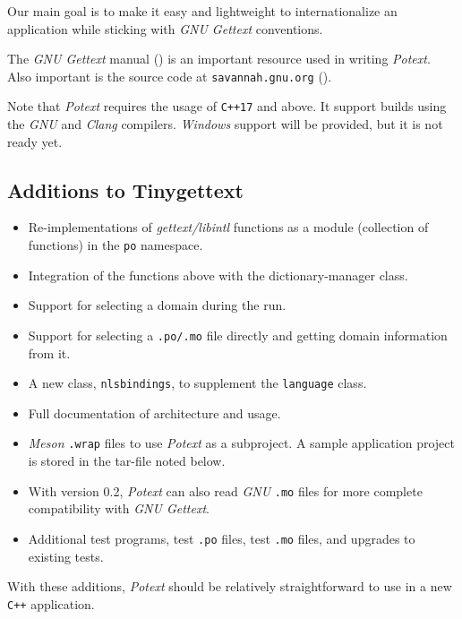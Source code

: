 \documentclass[
 11pt,
 twoside,
 a4paper,
 final                                 %
]{article}
\begin{document}
   Our main goal is to make it easy and lightweight to internationalize
   an application while sticking with \textsl{GNU Gettext}
   conventions.

   The \textsl{GNU Gettext} manual (\cite{gettextman}) is an important
   resource used in writing \textsl{Potext}.
   Also important is the source code at
   \texttt{savannah.gnu.org} (\cite{gettextcode}).

   Note that \textsl{Potext} requires the usage of \texttt{C++17}
   and above. It support builds using the \textsl{GNU} and \textsl{Clang}
   compilers.
   \textsl{Windows} support will be provided, but it is not ready yet.

\subsection{Additions to Tinygettext}
\label{subsec:introduction_additions}

   \begin{itemize}
      \item Re-implementations of \textsl{gettext/libintl}
         functions as a module
         (collection of functions) in the \texttt{po} namespace.
      \item Integration of the functions above with the
         dictionary-manager class.
      \item Support for selecting a domain during the run.
      \item Support for selecting a \texttt{.po/.mo} file directly
         and getting domain information from it.
      \item A new class, \texttt{nlsbindings}, to supplement the
         \texttt{language} class.
      \item Full documentation of architecture and usage.
      \item \textsl{Meson} \texttt{.wrap} files to use \textsl{Potext}
         as a subproject.
         A sample application project is stored in the tar-file noted
         below.
      \item With version 0.2, \textsl{Potext} can also read
         \textsl{GNU} \texttt{.mo} files for more complete
         compatibility with \textsl{GNU Gettext}.
      \item Additional test programs, test \texttt{.po} files,
         test \texttt{.mo} files, and upgrades to existing tests.
   \end{itemize}

   With these additions, \textsl{Potext} should be relatively straightforward
   to use in a new \texttt{C++} application.
\end{document}
